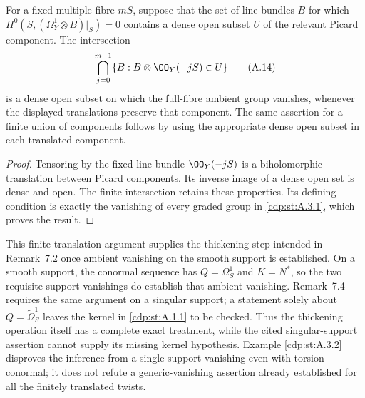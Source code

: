 
\begin{proposition}\label{cdp:st:A.3.3}
For a fixed multiple fibre $mS$, suppose that the set of line bundles $B$ for which $H^0(S,(\Omega_Y^1\otimes B)|_S)=0$ contains a dense open subset $U$ of the relevant Picard component. The intersection
\[
\bigcap_{j=0}^{m-1}\{B:B\otimes\OO_Y(-jS)\in U\}
\tag{A.14}\label{cdp:eq:A.14}
\]
is a dense open subset on which the full-fibre ambient group vanishes, whenever the displayed translations preserve that component. The same assertion for a finite union of components follows by using the appropriate dense open subset in each translated component.
\end{proposition}
\begin{proof}
Tensoring by the fixed line bundle $\OO_Y(-jS)$ is a biholomorphic translation between Picard components. Its inverse image of a dense open set is dense and open. The finite intersection retains these properties. Its defining condition is exactly the vanishing of every graded group in \ref{cdp:st:A.3.1}, which proves the result.
\end{proof}

This finite-translation argument supplies the thickening step intended in Remark~7.2 once ambient vanishing on the smooth support is established. On a smooth support, the conormal sequence has $Q=\Omega_S^1$ and $K=N^*$, so the two requisite support vanishings do establish that ambient vanishing. Remark~7.4 requires the same argument on a singular support; a statement solely about $Q=\widetilde\Omega_S^1$ leaves the kernel in \ref{cdp:st:A.1.1} to be checked. Thus the thickening operation itself has a complete exact treatment, while the cited singular-support assertion cannot supply its missing kernel hypothesis. Example \ref{cdp:st:A.3.2} disproves the inference from a single support vanishing even with torsion conormal; it does not refute a generic-vanishing assertion already established for all the finitely translated twists.


